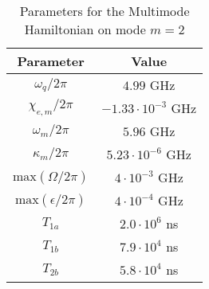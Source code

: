 \documentclass[
  amsfonts,
  amsmath,
  tbtags,
  amssymb,
  aps,
  nobibnotes,
  twocolumn,
  superscriptaddress,
]{revtex4-2}
\begin{document}
\begin{table}[H]
  \begin{tabular}{c | c}
    Parameter & Value\\
    \hline
    $\omega_{q} /2 \pi$ & $4.99$ GHz\\ %
    $\chi_{e,m} /2 \pi$ & $-1.33 \cdot 10^{-3}$ GHz\\
    $\omega_{m} /2 \pi$ & $5.96$ GHz\\
    $\kappa_{m} /2 \pi$ & $5.23 \cdot 10^{-6}$ GHz\\
    $\textrm{max}(\Omega / 2 \pi)$ & $4 \cdot 10^{-3}$ GHz\\
    $\textrm{max}(\epsilon / 2 \pi)$ & $4 \cdot 10^{-4}$ GHz\\
    $T_{1a}$ & $2.0 \cdot 10^{6}$ ns\\
    $T_{1b}$ & $7.9 \cdot 10^{4}$ ns\\
    $T_{2b}$ & $5.8 \cdot 10^{4}$ ns\\
  \end{tabular}
  \caption{Parameters for the Multimode Hamiltonian on mode $m = 2$}
  \label{tab:pham}
\end{table}


\end{document}
